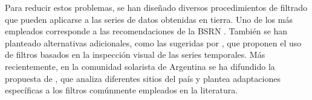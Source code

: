 Para reducir estos problemas, se han diseñado diversos procedimientos de filtrado que pueden aplicarse a las series de datos obtenidas en tierra. Uno de los más empleados corresponde a las recomendaciones de la BSRN \citep{Long2008, Long2010, Roesch2010}. También se han planteado alternativas adicionales, como las sugeridas por \cite{abal2020}, que proponen el uso de filtros basados en la inspección visual de las series temporales. Más recientemente, en la comunidad solarista de Argentina se ha difundido la propuesta de \cite{Nollas2023}, que analiza diferentes sitios del país y plantea adaptaciones específicas a los filtros comúnmente empleados en la literatura.

